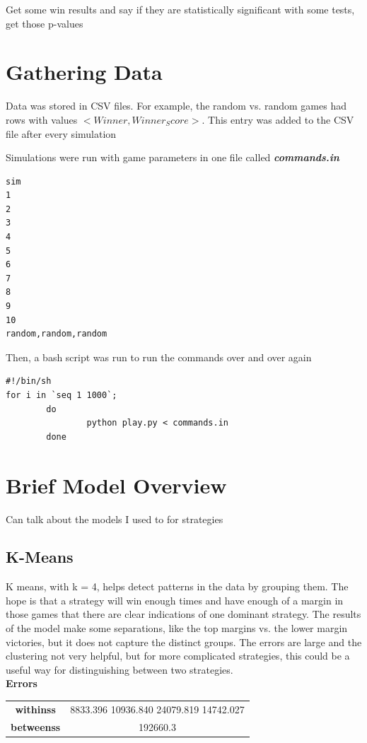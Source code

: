 \documentclass[11pt, oneside]{article}   	%
\begin{document}
Get some win results and say if they are statistically significant with some tests, get those p-values

\section{Gathering Data}

Data was stored in CSV files. For example, the random vs. random games had rows with values  $<Winner, Winner_Score>$. This entry was added to the CSV file after every simulation

Simulations were run with game parameters in one file called \textbf{\textit{commands.in}}

\begin{verbatim}
sim
1
2
3
4
5
6
7
8
9
10
random,random,random
\end{verbatim}

Then, a bash script was run to run the commands over and over again

\begin{verbatim}
#!/bin/sh
for i in `seq 1 1000`;
        do
                python play.py < commands.in
        done
\end{verbatim}


\section{Brief Model Overview}

Can talk about the models I used to for strategies

\subsection{K-Means}

K means, with k = 4, helps detect patterns in the data by grouping them. The hope is that a strategy will win enough times and have enough of a margin in those games that there are clear indications of one dominant strategy. The results of the model make some separations, like the top margins vs. the lower margin victories, but it does not capture the distinct groups. The errors are large and the clustering not very helpful, but for more complicated strategies, this could be a useful way for distinguishing between two strategies. 
\\

\textbf{Errors}\\

\begin{center}
\begin{tabular}{||c | c ||}
\hline
 \textbf{withinss} & 8833.396 10936.840 24079.819 14742.027 \\ 
 \textbf{betweenss} & 192660.3 \\  
 \hline
\end{tabular}
\end{center}
\end{document}
